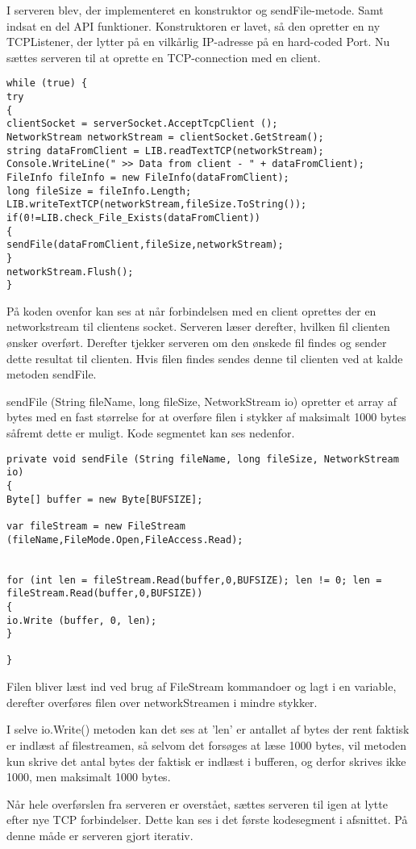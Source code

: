 I serveren blev, der implementeret en konstruktor og sendFile-metode. Samt indsat en del API funktioner. 
Konstruktoren er lavet, så den opretter en ny TCPListener, der lytter på en vilkårlig IP-adresse på en hard-coded Port.
Nu sættes serveren til at oprette en TCP-connection med en client.
\begin{verbatim}
while (true) {
try
{
clientSocket = serverSocket.AcceptTcpClient ();
NetworkStream networkStream = clientSocket.GetStream();
string dataFromClient = LIB.readTextTCP(networkStream);
Console.WriteLine(" >> Data from client - " + dataFromClient);
FileInfo fileInfo = new FileInfo(dataFromClient);
long fileSize = fileInfo.Length;
LIB.writeTextTCP(networkStream,fileSize.ToString());
if(0!=LIB.check_File_Exists(dataFromClient))
{
sendFile(dataFromClient,fileSize,networkStream);
}
networkStream.Flush();
}
\end{verbatim}

På koden ovenfor kan ses at når forbindelsen med en client oprettes der en networkstream til clientens socket. Serveren læser derefter, hvilken fil clienten ønsker overført. 
Derefter tjekker serveren om den ønskede fil findes og sender dette resultat til clienten.
Hvis filen findes sendes denne til clienten ved at kalde metoden sendFile.

sendFile (String fileName, long fileSize, NetworkStream io) opretter et array af bytes med en fast størrelse for at overføre filen i stykker af maksimalt 1000 bytes såfremt dette er muligt. Kode segmentet kan ses nedenfor.

\begin{verbatim}
private void sendFile (String fileName, long fileSize, NetworkStream io)
{
Byte[] buffer = new Byte[BUFSIZE];

var fileStream = new FileStream (fileName,FileMode.Open,FileAccess.Read);


for (int len = fileStream.Read(buffer,0,BUFSIZE); len != 0; len =
fileStream.Read(buffer,0,BUFSIZE))
{
io.Write (buffer, 0, len);
}

}
\end{verbatim}
Filen bliver læst ind ved brug af FileStream kommandoer og lagt i en variable, derefter overføres filen over networkStreamen i mindre stykker.

I selve io.Write() metoden kan det ses at 'len' er antallet af bytes der rent faktisk er indlæst af filestreamen, så selvom det forsøges at læse 1000 bytes, vil metoden kun skrive det antal bytes der faktisk er indlæst i bufferen, og derfor skrives ikke 1000, men maksimalt 1000 bytes.


Når hele overførslen fra serveren er overstået, sættes serveren til igen at lytte efter nye TCP forbindelser. Dette kan ses i det første kodesegment i afsnittet. På denne måde er serveren gjort iterativ.